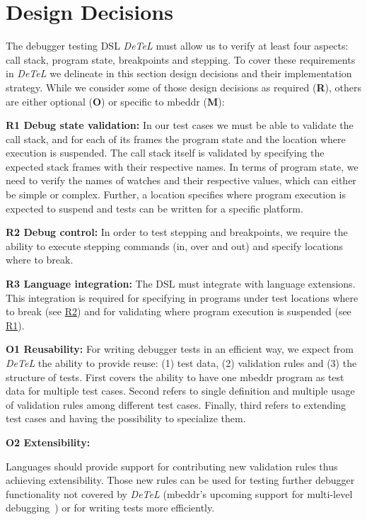 \section{Design Decisions}
\label{DesignDecisions}

The debugger testing \ac{DSL} \emph{DeTeL} must allow us to verify at least
four aspects: call stack, program state, breakpoints and stepping.
To cover these requirements in \emph{DeTeL} we delineate in this section design
decisions and their implementation strategy. While we consider some of those
design decisions as required (\textbf{R}), others are either optional
(\textbf{O}) or specific to mbeddr (\textbf{M}):


\textbf{\label{R1}R1 Debug state validation:} In our test cases we
must be able to validate the call stack, and for each of its frames 
the program state and the location where execution is suspended. 
The call stack itself is validated by specifying the expected stack
frames with their respective names. In terms of program state, we need to verify
the names of watches and their respective values, which can either be simple
or complex. Further, a location specifies where program execution is
expected to suspend and tests can be written for a specific platform. 

\textbf{\label{R2}R2 Debug control:} In order to test stepping
and breakpoints, we require the ability to execute stepping commands
(in, over and out) and specify locations where to break.

\textbf{\label{R3}R3 Language integration:} The
\ac{DSL} must integrate with language extensions.
This integration is required for specifying in programs under test
locations where to break (see \hyperref[R2]{R2}) and for validating where
program execution is suspended (see \hyperref[R1]{R1}).

\textbf{\label{O1}O1 Reusability:} For writing debugger tests in
an efficient way, we expect from \emph{DeTeL} the ability to provide reuse: (1)
test data, (2) validation rules and (3) the structure of tests. First covers
the ability to have one mbeddr program as test data for multiple test cases.
Second refers to single definition and multiple usage of validation rules among
different test cases. Finally, third refers to extending test cases and
having the possibility to specialize them.

\textbf{\label{O2}O2 Extensibility:} 

Languages should provide support for contributing new
validation rules thus achieving extensibility. Those new rules can be used for
testing further debugger functionality not covered by \emph{DeTeL} (\eg mbeddr's
upcoming support for multi-level debugging~\cite{MultiLevelDebugging:WSRE:breakedForInlining}) 
or for writing tests more efficiently.


